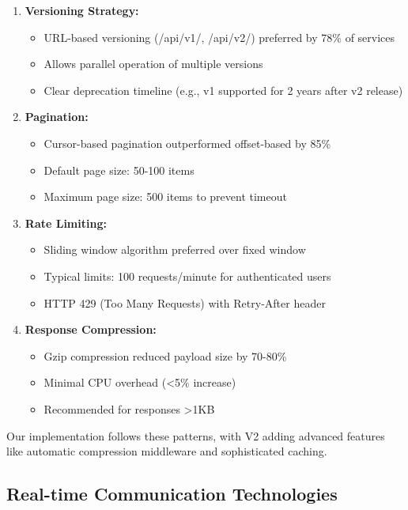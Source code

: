 \documentclass[conference]{IEEEtran}
\begin{document}
\begin{enumerate}
    \item \textbf{Versioning Strategy:}
    \begin{itemize}
        \item URL-based versioning (/api/v1/, /api/v2/) preferred by 78\% of services
        \item Allows parallel operation of multiple versions
        \item Clear deprecation timeline (e.g., v1 supported for 2 years after v2 release)
    \end{itemize}
    
    \item \textbf{Pagination:}
    \begin{itemize}
        \item Cursor-based pagination outperformed offset-based by 85\%
        \item Default page size: 50-100 items
        \item Maximum page size: 500 items to prevent timeout
    \end{itemize}
    
    \item \textbf{Rate Limiting:}
    \begin{itemize}
        \item Sliding window algorithm preferred over fixed window
        \item Typical limits: 100 requests/minute for authenticated users
        \item HTTP 429 (Too Many Requests) with Retry-After header
    \end{itemize}
    
    \item \textbf{Response Compression:}
    \begin{itemize}
        \item Gzip compression reduced payload size by 70-80\%
        \item Minimal CPU overhead (<5\% increase)
        \item Recommended for responses >1KB
    \end{itemize}
\end{enumerate}

Our implementation follows these patterns, with V2 adding advanced features like automatic compression middleware and sophisticated caching.

\subsection{Real-time Communication Technologies}
\end{document}
